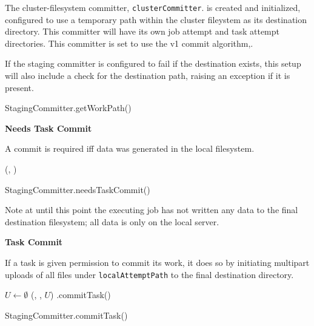 \documentclass[conference]{IEEEtran}
\begin{document}
The cluster-filesystem committer, \texttt{clusterCommitter}.
is created and initialized, configured to use a temporary path within the
cluster fileystem as its destination directory.
This committer will have its own job attempt and task attempt directories.
This committer is set to use the v1 commit algorithm,.

If the staging committer is configured to fail if the destination exists,
this setup will also include a check for the destination path, raising
an exception if it is present.

\begin{function}
  \StagingVars
  \return \localAttemptPath\;

\caption{StagingCommitter.getWorkPath()}
\label{alg:StagingCommitter.getWorkPath}

\end{function}


\textbf{Needs Task Commit}

A commit is required iff data was generated in the local filesystem.

\begin{function}
  \StagingVars

  \return \exists(\localfs, \localAttemptPath)\;

  \caption{StagingCommitter.needsTaskCommit()}
  \label{alg:StagingCommitter.needsTaskCommit}

\end{function}

Note at until this point the executing job has not written any data to
the final destination filesystem;
all data is only on the local server.

\textbf{Task Commit}

If a task is given permission to commit its work, it does
so by initiating multipart uploads of all files under \texttt{localAttemptPath}
to the final destination directory.


\begin{procedure}
  \StagingVars
  $U \longleftarrow \emptyset$\;
  \savePendingSet(\clusterfs, \clusterTaskAttemptPath, $U$)\;
  \clusterCommitter.commitTask()\;

\caption{StagingCommitter.commitTask()}
\label{alg:StagingCommitter.commitTask}

\end{procedure}
\end{document}
